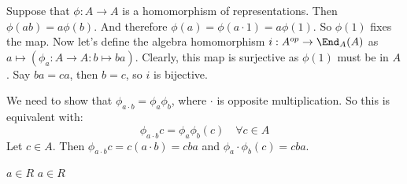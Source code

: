 Suppose that $\phi: A \to A$ is a homomorphism of representations. Then $\phi(ab)=a\phi(b)$.
And therefore $\phi(a)=\phi(a\cdot 1)=a\phi(1)$. So $\phi(1)$ fixes the map. Now let's define the algebra homomorphism $i : A^{op} \to \End_A(A) $ as $a \mapsto (\phi_a: A\to A: b \mapsto ba)$. Clearly, this map is surjective as $\phi(1)$ must be in $A$. Say $ba = ca$, then $b=c$, so $i$ is bijective.

We need to show that  $\phi_{a\cdot b}=\phi_a \phi_b$, where $\cdot$ is opposite multiplication. So this is equivalent with:
\[\phi_{a\cdot b}c = \phi_a \phi_b(c) \quad \forall c \in A \]
Let $c\in A$. Then $\phi_{a\cdot b}c = c(a\cdot b)=cba$ and $\phi_a \cdot \phi_b (c)= cba$.

$a∈R$ $a \in R$